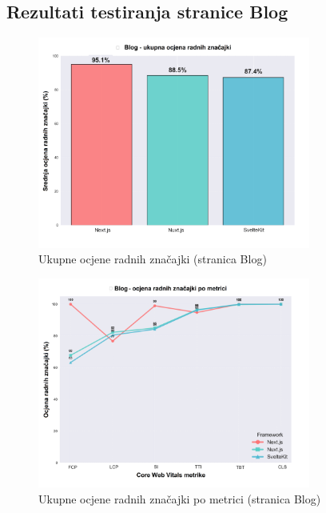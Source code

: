
\subsection{Rezultati testiranja stranice Blog}

\begin{figure}[H]
    \centering
    \includegraphics[width=0.8\textwidth]{slike/rezultati/blog/blog_framework_overall_performance.png}
    \caption{Ukupne ocjene radnih značajki (stranica Blog)}
    \label{fig:testiranje-blog-ukupne-performanse}
\end{figure}

\begin{figure}[H]
    \centering
    \includegraphics[width=0.8\textwidth]{slike/rezultati/blog/blog_performance_by_metric.png}
    \caption{Ukupne ocjene radnih značajki po metrici (stranica Blog)}
    \label{fig:testiranje-blog-performanse-po-metrici}
\end{figure}

